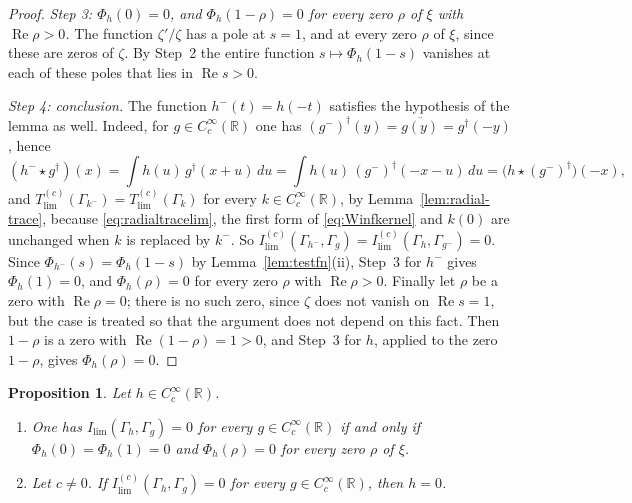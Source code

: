 \documentclass[11pt]{amsart}
\newtheorem{proposition}[theorem]{Proposition}
\theoremstyle{remark}
\numberwithin{equation}{section}
\newcommand{\R}{\mathbb R}
\newcommand{\Rel}{\operatorname{Re}}
\newcommand{\Il}{I_{\lim}}
\begin{document}
\begin{proof}
\emph{Step 3: $\Phi_h(0)=0$, and $\Phi_h(1-\rho)=0$ for every zero $\rho$
of $\xi$ with $\Rel\rho>0$.}  The function $\zeta'/\zeta$ has a pole at
$s=1$, and at every zero $\rho$ of $\xi$, since these are zeros of $\zeta$.
By Step~2 the entire function $s\mapsto\Phi_h(1-s)$ vanishes at each of
these poles that lies in $\Rel s>0$.

\emph{Step 4: conclusion.}  The function $h^-(t)=h(-t)$ satisfies the
hypothesis of the lemma as well.  Indeed, for $g\in C_c^\infty(\R)$ one has
$(g^-)^\dagger(y)=\overline{g(y)}=g^\dagger(-y)$, hence
\[
  (h^-\star g^\dagger)(x)=\int h(u)\,g^\dagger(x+u)\,du
  =\int h(u)\,(g^-)^\dagger(-x-u)\,du=\bigl(h\star(g^-)^\dagger\bigr)(-x),
\]
and $T^{(c)}_{\lim}(\Gamma_{k^-})=T^{(c)}_{\lim}(\Gamma_k)$ for every
$k\in C_c^\infty(\R)$, by Lemma~\ref{lem:radial-trace}, because
\eqref{eq:radialtracelim}, the first form of \eqref{eq:Winfkernel} and
$k(0)$ are unchanged when $k$ is replaced by $k^-$.  So
$I^{(c)}_{\lim}(\Gamma_{h^-},\Gamma_g)=I^{(c)}_{\lim}(\Gamma_h,\Gamma_{g^-})=0$.
Since $\Phi_{h^-}(s)=\Phi_h(1-s)$ by Lemma~\ref{lem:testfn}(ii), Step~3 for
$h^-$ gives $\Phi_h(1)=0$, and $\Phi_h(\rho)=0$ for every zero $\rho$ with
$\Rel\rho>0$.  Finally let $\rho$ be a zero with $\Rel\rho=0$; there is no such zero,
since $\zeta$ does not vanish on $\Rel s=1$, but the case is treated so
that the argument does not depend on this fact.  Then
$1-\rho$ is a zero with $\Rel(1-\rho)=1>0$, and Step~3 for $h$, applied to
the zero $1-\rho$, gives $\Phi_h(\rho)=0$.
\end{proof}

\begin{proposition}
\label{prop:radicallim}
Let $h\in C_c^\infty(\R)$.
\begin{enumerate}
\item[(i)] One has $\Il(\Gamma_h,\Gamma_g)=0$ for every
$g\in C_c^\infty(\R)$ if and only if $\Phi_h(0)=\Phi_h(1)=0$ and
$\Phi_h(\rho)=0$ for every zero $\rho$ of $\xi$.
\item[(ii)] Let $c\ne0$.  If $I^{(c)}_{\lim}(\Gamma_h,\Gamma_g)=0$ for every
$g\in C_c^\infty(\R)$, then $h=0$.
\end{enumerate}
\end{proposition}
\end{document}
